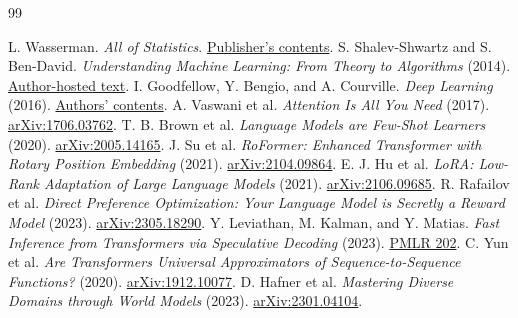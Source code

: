 \documentclass[11pt,oneside]{book}
\begin{document}
\begin{thebibliography}{99}
\raggedright
{} L. Wasserman. \textit{All of Statistics}.
\href{https://link.springer.com/book/10.1007/978-0-387-21736-9}{Publisher's contents}.
 S. Shalev-Shwartz and S. Ben-David.
\textit{Understanding Machine Learning: From Theory to Algorithms} (2014).
\href{https://www.cs.huji.ac.il/~shais/UnderstandingMachineLearning/understanding-machine-learning-theory-algorithms.pdf}{Author-hosted text}.
 I. Goodfellow, Y. Bengio, and A. Courville.
\textit{Deep Learning} (2016).
\href{https://www.deeplearningbook.org/contents/TOC.html}{Authors' contents}.
 A. Vaswani et al. \textit{Attention Is All You Need} (2017).
\href{https://arxiv.org/abs/1706.03762}{arXiv:1706.03762}.
 T. B. Brown et al. \textit{Language Models are Few-Shot Learners} (2020).
\href{https://arxiv.org/abs/2005.14165}{arXiv:2005.14165}.
 J. Su et al. \textit{RoFormer: Enhanced Transformer with Rotary Position Embedding} (2021).
\href{https://arxiv.org/abs/2104.09864}{arXiv:2104.09864}.
 E. J. Hu et al. \textit{LoRA: Low-Rank Adaptation of Large Language Models} (2021).
\href{https://arxiv.org/abs/2106.09685}{arXiv:2106.09685}.
 R. Rafailov et al. \textit{Direct Preference Optimization:
Your Language Model is Secretly a Reward Model} (2023).
\href{https://arxiv.org/abs/2305.18290}{arXiv:2305.18290}.
 Y. Leviathan, M. Kalman, and Y. Matias.
\textit{Fast Inference from Transformers via Speculative Decoding} (2023).
\href{https://proceedings.mlr.press/v202/leviathan23a.html}{PMLR 202}.
 C. Yun et al. \textit{Are Transformers Universal Approximators
of Sequence-to-Sequence Functions?} (2020).
\href{https://arxiv.org/abs/1912.10077}{arXiv:1912.10077}.
 D. Hafner et al. \textit{Mastering Diverse Domains through
World Models} (2023).
\href{https://arxiv.org/abs/2301.04104}{arXiv:2301.04104}.
\end{thebibliography}
\end{document}
